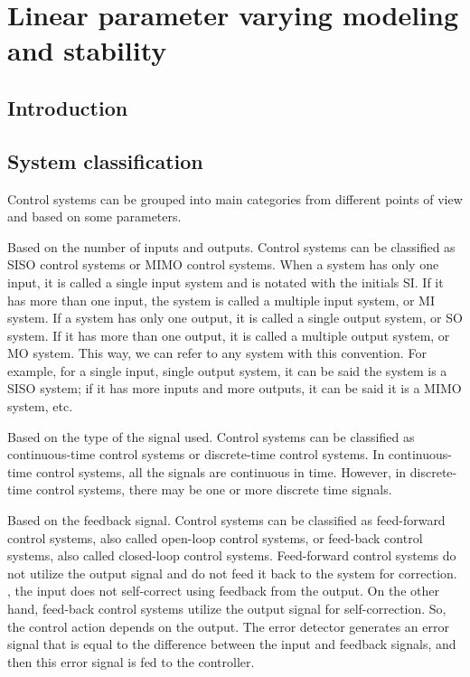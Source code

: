 \chapter{Linear parameter varying modeling and stability} 
\label{chap_linear_parameter_varying_modeling_and_stability}

\section{Introduction}


\section{System classification}
\label{sec_system_classification}

Control systems can be grouped into main categories from different points of view and based on some parameters.

Based on the number of inputs and outputs. Control systems can be classified as SISO control systems or MIMO control systems. When a system has only one input, it is called a single input system and is notated with the initials SI. If it has more than one input, the system is called a multiple input system, or MI system. If a system has only one output, it is called a single output system, or SO system. If it has more than one output, it is called a multiple output system, or MO system. This way, we can refer to any system with this convention. For example, for a single input, single output system, it can be said the system is a SISO system; if it has more inputs and more outputs, it can be said it is a MIMO system, etc.

Based on the type of the signal used. Control systems can be classified as continuous-time control systems or discrete-time control systems. In continuous-time control systems, all the signals are continuous in time. However, in discrete-time control systems, there may be one or more discrete time signals.

Based on the feedback signal. Control systems can be classified as feed-forward control systems, also called open-loop control systems, or feed-back control systems, also called closed-loop control systems. Feed-forward control systems do not utilize the output signal and do not feed it back to the system for correction. \Ie, the input does not self-correct using feedback from the output. On the other hand, feed-back control systems utilize the output signal for self-correction. So, the control action depends on the output. The error detector generates an error signal that is equal to the difference between the input and feedback signals, and then this error signal is fed to the controller.

